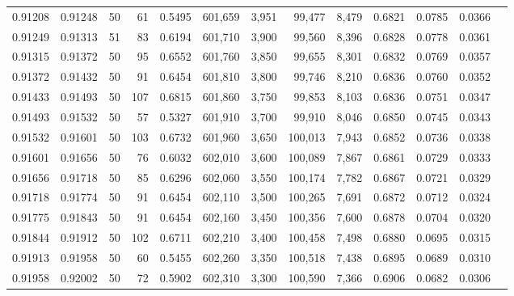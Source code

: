 \begin{tabular}{rrrrrrrrrrrrr}
0.91208 & 0.91248 &    50 &  61 &                                     0.5495 & 601,659 &   3,951 &  99,477 &   8,479 & 0.6821 & 0.0785 & 0.0366 \\
0.91249 & 0.91313 &    51 &  83 &                                     0.6194 & 601,710 &   3,900 &  99,560 &   8,396 & 0.6828 & 0.0778 & 0.0361 \\
0.91315 & 0.91372 &    50 &  95 &                                     0.6552 & 601,760 &   3,850 &  99,655 &   8,301 & 0.6832 & 0.0769 & 0.0357 \\
0.91372 & 0.91432 &    50 &  91 &                                     0.6454 & 601,810 &   3,800 &  99,746 &   8,210 & 0.6836 & 0.0760 & 0.0352 \\
0.91433 & 0.91493 &    50 & 107 &                                     0.6815 & 601,860 &   3,750 &  99,853 &   8,103 & 0.6836 & 0.0751 & 0.0347 \\
0.91493 & 0.91532 &    50 &  57 &                                     0.5327 & 601,910 &   3,700 &  99,910 &   8,046 & 0.6850 & 0.0745 & 0.0343 \\
0.91532 & 0.91601 &    50 & 103 &                                     0.6732 & 601,960 &   3,650 & 100,013 &   7,943 & 0.6852 & 0.0736 & 0.0338 \\
0.91601 & 0.91656 &    50 &  76 &                                     0.6032 & 602,010 &   3,600 & 100,089 &   7,867 & 0.6861 & 0.0729 & 0.0333 \\
0.91656 & 0.91718 &    50 &  85 &                                     0.6296 & 602,060 &   3,550 & 100,174 &   7,782 & 0.6867 & 0.0721 & 0.0329 \\
0.91718 & 0.91774 &    50 &  91 &                                     0.6454 & 602,110 &   3,500 & 100,265 &   7,691 & 0.6872 & 0.0712 & 0.0324 \\
0.91775 & 0.91843 &    50 &  91 &                                     0.6454 & 602,160 &   3,450 & 100,356 &   7,600 & 0.6878 & 0.0704 & 0.0320 \\
0.91844 & 0.91912 &    50 & 102 &                                     0.6711 & 602,210 &   3,400 & 100,458 &   7,498 & 0.6880 & 0.0695 & 0.0315 \\
0.91913 & 0.91958 &    50 &  60 &                                     0.5455 & 602,260 &   3,350 & 100,518 &   7,438 & 0.6895 & 0.0689 & 0.0310 \\
0.91958 & 0.92002 &    50 &  72 &                                     0.5902 & 602,310 &   3,300 & 100,590 &   7,366 & 0.6906 & 0.0682 & 0.0306 \\

\end{tabular}
